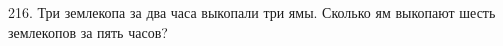 216. Три землекопа за два часа выкопали три ямы. Сколько ям выкопают шесть землекопов за пять часов?\\

